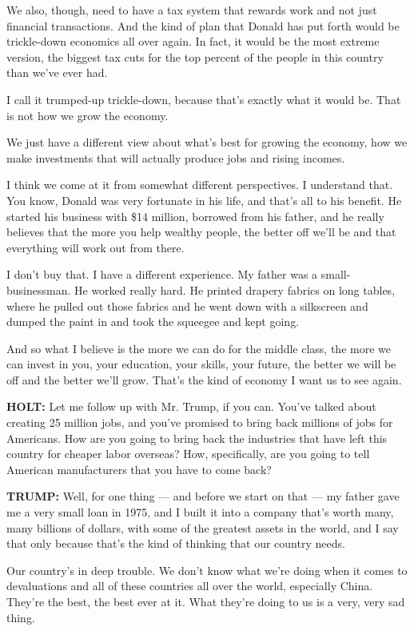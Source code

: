 We also, though, need to have a tax system that rewards work and not
just financial transactions. And the kind of plan that Donald has put
forth would be trickle-down economics all over again. In fact, it would
be the most extreme version, the biggest tax cuts for the top percent of
the people in this country than we've ever had.

I call it trumped-up trickle-down, because that's exactly what it would
be. That is not how we grow the economy.

We just have a different view about what's best for growing the economy,
how we make investments that will actually produce jobs and rising
incomes.

I think we come at it from somewhat different perspectives. I understand
that. You know, Donald was very fortunate in his life, and that's all to
his benefit. He started his business with \$14 million, borrowed from
his father, and he really believes that the more you help wealthy
people, the better off we'll be and that everything will work out from
there.

I don't buy that. I have a different experience. My father was a
small-businessman. He worked really hard. He printed drapery fabrics on
long tables, where he pulled out those fabrics and he went down with a
silkscreen and dumped the paint in and took the squeegee and kept going.

And so what I believe is the more we can do for the middle class, the
more we can invest in you, your education, your skills, your future, the
better we will be off and the better we'll grow. That's the kind of
economy I want us to see again.

\textbf{HOLT:} Let me follow up with Mr. Trump, if you can. You've
talked about creating 25 million jobs, and you've promised to bring back
millions of jobs for Americans. How are you going to bring back the
industries that have left this country for cheaper labor overseas? How,
specifically, are you going to tell American manufacturers that you have
to come back?

\textbf{TRUMP:} Well, for one thing --- and before we start on that ---
my father gave me a very small loan in 1975, and I built it into a
company that's worth many, many billions of dollars, with some of the
greatest assets in the world, and I say that only because that's the
kind of thinking that our country needs.

Our country's in deep trouble. We don't know what we're doing when it
comes to devaluations and all of these countries all over the world,
especially China. They're the best, the best ever at it. What they're
doing to us is a very, very sad thing.

